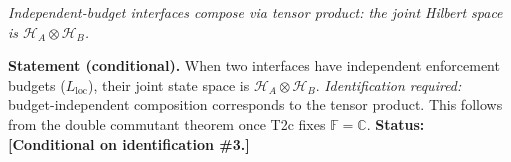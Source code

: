 \documentclass[11pt]{article}
\theoremstyle{remark}
\begin{document}
\begin{tcolorbox}[apfbox, title={$T_{\mathrm{tensor}}$: Tensor Products from Independent Interfaces}]
\textit{Independent-budget interfaces compose via tensor product: the joint Hilbert space is $\mathcal{H}_A \otimes \mathcal{H}_B$.}

\smallskip\noindent\textbf{Statement (conditional).}  When two interfaces have independent enforcement budgets ($L_{\mathrm{loc}}$), their joint state space is $\mathcal{H}_A \otimes \mathcal{H}_B$.  \textit{Identification required:} budget-independent composition corresponds to the tensor product.  This follows from the double commutant theorem once T2c fixes $\mathbb{F} = \mathbb{C}$.  \textbf{Status:} \textbf{[Conditional on identification \#3.]}
\end{tcolorbox}
\end{document}
